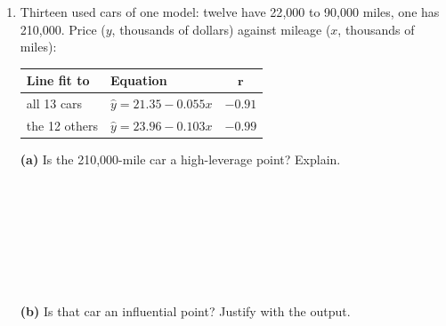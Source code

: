 \documentclass[12pt]{article}
\begin{document}
\vspace{0.06in}

\begin{enumerate}[leftmargin=1.9em, itemsep=0.10in, resume]

  \boxguard[20]
  \item \begin{minipage}[t]{0.50\linewidth}\raggedright
        Thirteen used cars of one model: twelve have 22{,}000 to 90{,}000 miles, one has
        210{,}000. Price ($y$, thousands of dollars) against mileage ($x$, thousands of miles):
        \end{minipage}\hfill
        \begin{minipage}[t]{0.46\linewidth}\vspace{0pt}\centering\small
        \setlength{\tabcolsep}{4pt}%
        \renewcommand{\arraystretch}{1.1}
        \begin{tabular}{@{} l l c @{}}
        \rowcolor{sky}
        \textbf{Line fit to} & \textbf{Equation} & $\boldsymbol{r}$ \\
        \hline
        all 13 cars & $\hat{y} = 21.35 - 0.055x$ & $-0.91$ \\
        the 12 others & $\hat{y} = 23.96 - 0.103x$ & $-0.99$ \\
        \end{tabular}
        \end{minipage}

        \vspace{6pt}

        \boxguard[14]
        \textbf{(a)} Is the 210{,}000-mile car a high-leverage point? Explain.\\[4pt]
        \\
        \ansline{}\\
        \ansline{}\\
        \ansline{}\\
        \ansline{}\\
        \ansline{}\\
        \ansline{}\\
        \ansline{}

        \vspace{4pt}
        \boxguard[14]
        \textbf{(b)} Is that car an influential point? Justify with the output.\\[4pt]
        \\
        \\
        \ansline{}\\
        \ansline{}\\
        \ansline{}\\
        \ansline{}\\
        \ansline{}\\
        \ansline{}


\end{enumerate}
\end{document}
